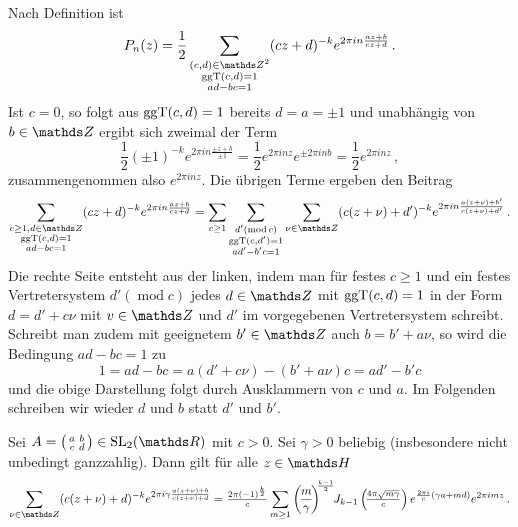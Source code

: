 \begin{bewe}
Nach Definition ist 
\[
	P_n(z) = \frac 12 \sum_{\substack{(c,d)\in\ZZ^2 \\ \ggt(c,d) = 1 \\ ad-bc = 1}} (cz+d)^{-k} e^{2\pi in \frac{az+b}{cz+d}}
	\,.
\]
Ist $c = 0$, so folgt aus $\operatorname{ggT}(c,d) = 1$ bereits $d = a = \pm 1$ und unabhängig von $b \in \ZZ$ ergibt sich zweimal der Term
\[
	\frac 12 (\pm 1)^{-k} e^{2\pi in \frac{\pm z + b}{\pm 1}} = \frac 12 e^{2\pi in z} e^{\pm 2\pi in b} = \frac 12 e^{2 \pi inz}
	\,,
\]
zusammengenommen also $e^{2 \pi inz}$. Die übrigen Terme ergeben den Beitrag 
\[
	\sum_{\substack{c \geq 1, d \in \ZZ \\ \ggt(c,d) = 1 \\ ad-bc = 1}} (cz+d)^{-k} e^{2 \pi i n \frac{az+b}{cz+d}} = \sum_{c \geq 1} \sum_{\substack{d' (\operatorname{mod} c) \\ \ggt(c,d') = 1 \\ ad'-b'c = 1}} \sum_{\nu \in \ZZ} (c(z + \nu) +d')^{-k} e^{2\pi in \frac{a(z+\nu)+b'}{c(z+\nu)+d'}}
	\,.
\]
Die rechte Seite entsteht aus der linken, indem man für festes $c \geq 1$ und ein festes Vertretersystem $d' (\operatorname{mod} c)$ jedes $d \in \ZZ$ mit $\operatorname{ggT}(c,d) = 1$ in der Form $d = d' + c\nu$ mit $v \in \ZZ$ und $d'$ im vorgegebenen Vertretersystem schreibt. Schreibt man zudem mit geeignetem $b' \in \ZZ$ auch $b = b' + a\nu$, so wird die Bedingung $ad - bc = 1$ zu
\[
	1 = ad - bc = a(d' + c\nu) - (b' + a\nu)c = ad' - b'c
\]
und die obige Darstellung folgt durch Ausklammern von $c$ und $a$. Im Folgenden schreiben wir wieder $d$ und $b$ statt $d'$ und $b'$.

\begin{lemm}
Sei $A = \mymat abcd \in \SL_2(\RR)$ mit $c > 0$. Sei $\gamma > 0$ beliebig (insbesondere nicht unbedingt ganzzahlig). Dann gilt für alle $z \in \HH$
\[
	\sum_{\nu \in \ZZ} (c(z + \nu) +d)^{-k} e^{2\pi i\gamma \frac{a(z+\nu)+b}{c(z+\nu)+d}} 
	= 
	\tfrac{2\pi (-1)^{\frac k2}}c \sum_{m \geq 1} \left(\!\frac m\gamma\!\right)^{\!\!\frac{k-1}2} \!\! J_{k-1}\left(\!\tfrac{4\pi\sqrt{m\gamma}}c\right) e^{\frac{2\pi i}c (\gamma a + md)} e^{2\pi imz}
	\,.
\]
\end{lemm}


\end{bewe}
